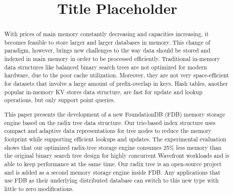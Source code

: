 \documentclass[sigplan,screen,nonacm]{acmart}
\begin{document}
\title{Title Placeholder}

\begin{abstract}
With prices of main memory constantly decreasing and capacities increasing, it becomes feasible to store larger and larger databases in memory. This change of paradigm, however, brings new challenges to the way data should be stored and indexed in main memory in order to be processed efficiently. Traditional in-memory data structures like balanced binary search trees are not optimized for modern hardware, due to the poor cache utilization. Moreover, they are not very space-efficient for datasets that involve a large amount of prefix-overlap in keys. Hash tables, another popular in-memory KV stores data structure, are fast for update and lookup operations, but only support point queries. 

This paper presents the development of a new FoundationDB (FDB) memory storage engine based on the radix tree data structure. Our trie-based index structure uses compact and adaptive data representations for tree nodes to reduce the memory footprint while supporting efficient lookups and updates. The experimental evaluation shows that our optimized radix-tree storage engine consumes 25\% less memory than the original binary search tree design for highly concurrent Wavefront workloads and is able to keep performance at the same time. Our radix tree is an open-source project and is added as a second memory storage engine inside FDB. Any applications that use FDB as their underlying distributed database can switch to this new type with little to zero modifications. 
\end{abstract}


\maketitle
\end{document}
